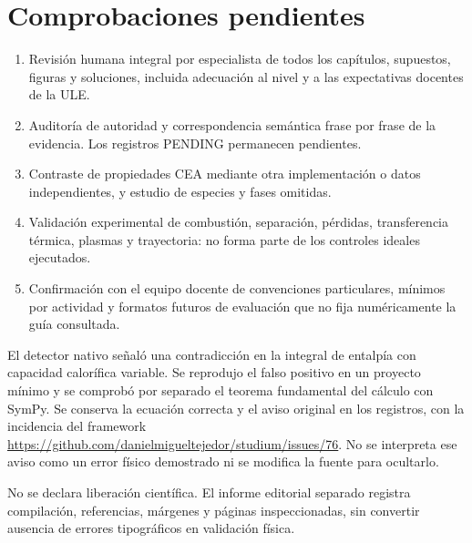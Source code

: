\section{Comprobaciones pendientes}
\begin{enumerate}
\item Revisión humana integral por especialista de todos los capítulos, supuestos, figuras y soluciones, incluida adecuación al nivel y a las expectativas docentes de la ULE.
\item Auditoría de autoridad y correspondencia semántica frase por frase de la evidencia. Los registros PENDING permanecen pendientes.
\item Contraste de propiedades CEA mediante otra implementación o datos independientes, y estudio de especies y fases omitidas.
\item Validación experimental de combustión, separación, pérdidas, transferencia térmica, plasmas y trayectoria: no forma parte de los controles ideales ejecutados.
\item Confirmación con el equipo docente de convenciones particulares, mínimos por actividad y formatos futuros de evaluación que no fija numéricamente la guía consultada.
\end{enumerate}
El detector nativo señaló una contradicción en la integral de entalpía con capacidad calorífica variable. Se reprodujo el falso positivo en un proyecto mínimo y se comprobó por separado el teorema fundamental del cálculo con SymPy. Se conserva la ecuación correcta y el aviso original en los registros, con la incidencia del framework \url{https://github.com/danielmigueltejedor/studium/issues/76}. No se interpreta ese aviso como un error físico demostrado ni se modifica la fuente para ocultarlo.

No se declara liberación científica. El informe editorial separado registra compilación, referencias, márgenes y páginas inspeccionadas, sin convertir ausencia de errores tipográficos en validación física.
